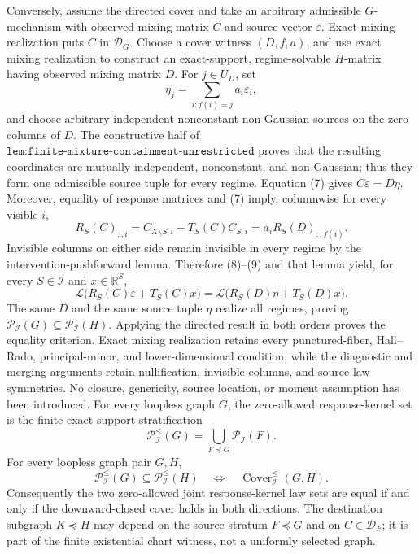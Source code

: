 Conversely, assume the directed cover and take an arbitrary admissible \(G\)-mechanism with observed mixing matrix \(C\) and source vector \(\varepsilon\). Exact mixing realization puts \(C\) in \(\mathcal D_G\). Choose a cover witness \((D,f,a)\), and use exact mixing realization to construct an exact-support, regime-solvable \(H\)-matrix having observed mixing matrix \(D\). For \(j\in U_D\), set
\[
\eta_j=\sum_{i:f(i)=j}a_i\varepsilon_i, \tag{8}
\]
and choose arbitrary independent nonconstant non-Gaussian sources on the zero columns of \(D\). The constructive half of \(\texttt{lem:finite-mixture-containment-unrestricted}\) proves that the resulting coordinates are mutually independent, nonconstant, and non-Gaussian; thus they form one admissible source tuple for every regime. Equation (7) gives \(C\varepsilon=D\eta\). Moreover, equality of response matrices and (7) imply, columnwise for every visible \(i\),
\[
R_S(C)_{:,i}
=C_{X\setminus S,i}-T_S(C)C_{S,i}
=a_iR_S(D)_{:,f(i)}. \tag{9}
\]
Invisible columns on either side remain invisible in every regime by the intervention-pushforward lemma. Therefore (8)--(9) and that lemma yield, for every \(S\in\mathcal I\) and \(x\in\mathbb R^S\),
\[
\mathcal L\bigl(R_S(C)\varepsilon+T_S(C)x\bigr)
=\mathcal L\bigl(R_S(D)\eta+T_S(D)x\bigr).
\]
The same \(D\) and the same source tuple \(\eta\) realize all regimes, proving \(\mathcal P_{\mathcal I}(G)\subseteq\mathcal P_{\mathcal I}(H)\). Applying the directed result in both orders proves the equality criterion. Exact mixing realization retains every punctured-fiber, Hall--Rado, principal-minor, and lower-dimensional condition, while the diagnostic and merging arguments retain nullification, invisible columns, and source-law symmetries. No closure, genericity, source location, or moment assumption has been introduced.
For every loopless graph \(G\), the zero-allowed response-kernel set is the finite exact-support stratification
\[
\mathcal P^{\le}_{\mathcal I}(G)=\bigcup_{F\preceq G}\mathcal P_{\mathcal I}(F).
\]
For every loopless graph pair \(G,H\),
\[
\mathcal P^{\le}_{\mathcal I}(G)\subseteq\mathcal P^{\le}_{\mathcal I}(H)
\quad\Longleftrightarrow\quad
\operatorname{Cover}^{\le}_{\mathcal I}(G,H).
\]
Consequently the two zero-allowed joint response-kernel law sets are equal if and only if the downward-closed cover holds in both directions. The destination subgraph \(K\preceq H\) may depend on the source stratum \(F\preceq G\) and on \(C\in\mathcal D_F\); it is part of the finite existential chart witness, not a uniformly selected graph.
